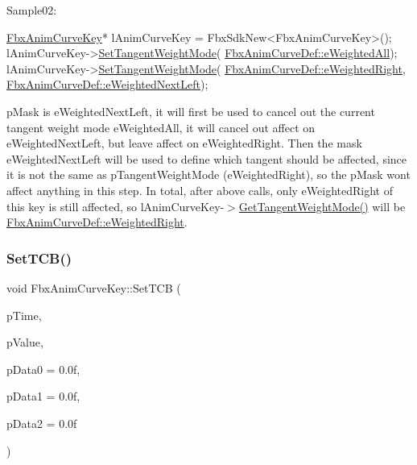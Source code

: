 Sample02\+: 
\begin{DoxyCode}
\hyperlink{class_fbx_anim_curve_key}{FbxAnimCurveKey}* lAnimCurveKey = FbxSdkNew<FbxAnimCurveKey>();
lAnimCurveKey->\hyperlink{class_fbx_anim_curve_key_a418159da0643ccdbeb5aa59b69b821e0}{SetTangentWeightMode}(
      \hyperlink{class_fbx_anim_curve_def_aeee6e9cc12501e10dbd3e5caaf66990ea4337e6853fab642c2a432ab1bb303922}{FbxAnimCurveDef::eWeightedAll});
lAnimCurveKey->\hyperlink{class_fbx_anim_curve_key_a418159da0643ccdbeb5aa59b69b821e0}{SetTangentWeightMode}(
      \hyperlink{class_fbx_anim_curve_def_aeee6e9cc12501e10dbd3e5caaf66990ea869960737022db21fc64480daa22725a}{FbxAnimCurveDef::eWeightedRight}, 
      \hyperlink{class_fbx_anim_curve_def_aeee6e9cc12501e10dbd3e5caaf66990eae28d75f955feebe5756d77ad0765d000}{FbxAnimCurveDef::eWeightedNextLeft});
\end{DoxyCode}
 p\+Mask is e\+Weighted\+Next\+Left, it will first be used to cancel out the current tangent weight mode e\+Weighted\+All, it will cancel out affect on e\+Weighted\+Next\+Left, but leave affect on e\+Weighted\+Right. Then the mask e\+Weighted\+Next\+Left will be used to define which tangent should be affected, since it is not the same as p\+Tangent\+Weight\+Mode (e\+Weighted\+Right), so the p\+Mask won\textquotesingle{}t affect anything in this step. In total, after above calls, only e\+Weighted\+Right of this key is still affected, so l\+Anim\+Curve\+Key-\/$>$\hyperlink{class_fbx_anim_curve_key_a6971443814d64229442becc934315c56}{Get\+Tangent\+Weight\+Mode()} will be \hyperlink{class_fbx_anim_curve_def_aeee6e9cc12501e10dbd3e5caaf66990ea869960737022db21fc64480daa22725a}{Fbx\+Anim\+Curve\+Def\+::e\+Weighted\+Right}. \mbox{\label{class_fbx_anim_curve_key_ace0cb6af3027da5a2ea28ac7e5f528be}} 
\subsubsection{\texorpdfstring{Set\+T\+C\+B()}{SetTCB()}}
{\footnotesize\ttfamily void Fbx\+Anim\+Curve\+Key\+::\+Set\+T\+CB (\begin{DoxyParamCaption}\item[{\hyperlink{class_fbx_time}{Fbx\+Time}}]{p\+Time,  }\item[{float}]{p\+Value,  }\item[{float}]{p\+Data0 = {\ttfamily 0.0f},  }\item[{float}]{p\+Data1 = {\ttfamily 0.0f},  }\item[{float}]{p\+Data2 = {\ttfamily 0.0f} }\end{DoxyParamCaption})}

